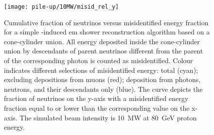 \begin{figure}[htb]
	\centering
	\texttt{[image: pile-up/10MW/misid\_rel\_y]}
	\caption{Cumulative fraction of neutrinos versus misidentified energy fraction for a simple \Pgpz-induced \gls{em} shower reconstruction algorithm based on a cone-cylinder union.
		All energy deposited inside the cone-cylinder union by descendants of parent neutrinos different from the parent of the corresponding \Pgpz photon is counted as misidentified.
		Colour indicates different selections of misidentified energy: total (cyan); excluding depositions from muons (red); deposition from photons, neutrons, and their descendants only (blue).
		The curve depicts the fraction of neutrinos on the y-axis with a misidentified energy fraction equal to or lower than the corresponding value on the x-axis.
		The simulated beam intensity is \SI{10}{\mega\watt} at \SI{80}{\giga\electronvolt} proton energy.}
\end{figure}